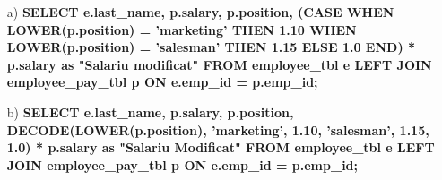 \documentclass[a4paper,12pt]{article}
\begin{document}
	\begin{itemize}
		\item[a)] \textbf{SELECT e.last\_name, p.salary, p.position,
			(CASE 
			WHEN LOWER(p.position) = 'marketing' THEN 1.10
			WHEN LOWER(p.position) = 'salesman' THEN 1.15
			ELSE 1.0
			END) * p.salary as "Salariu modificat"
			FROM employee\_tbl e LEFT JOIN employee\_pay\_tbl p ON e.emp\_id = p.emp\_id;\\}
		
		\item[b)] \textbf{SELECT e.last\_name, p.salary, p.position, 
			DECODE(LOWER(p.position), 'marketing', 1.10,
			'salesman', 1.15,
			1.0) * p.salary as "Salariu Modificat"
			FROM employee\_tbl e LEFT JOIN employee\_pay\_tbl p ON e.emp\_id = p.emp\_id;}
	\end{itemize}
\end{document}
